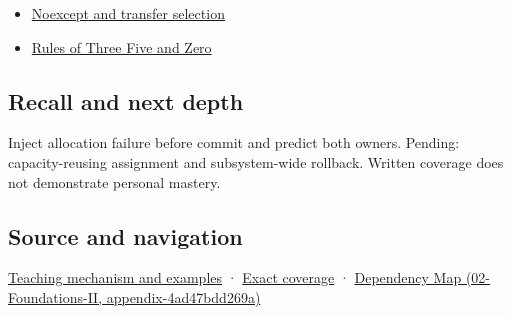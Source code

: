 \begin{itemize}
\tightlist
\item
  \hyperref[appendix-c746afaa47d1]{Noexcept and transfer selection}
\item
  \hyperref[appendix-7679107d057e]{Rules of Three Five and Zero}
\end{itemize}

\subsection{Recall and next depth}\label{appendix-bea6beb5350f-recall-and-next-depth}

Inject allocation failure before commit and predict both owners. Pending: capacity-reusing assignment and subsystem-wide rollback. Written coverage does not demonstrate personal mastery.

\subsection{Source and navigation}\label{appendix-bea6beb5350f-source-and-navigation}

\hyperref[01-foundations-i-ch003-replacing-a-value-is-not-creating-an-object]{Teaching mechanism and examples} · \hyperref[appendix-fd090d982a15-m009---parts-127-147]{Exact coverage} · \href{../02-Foundations-II/main.pdf\#nameddest=appendix-4ad47bdd269a}{Dependency Map (02-Foundations-II, appendix-4ad47bdd269a)}
